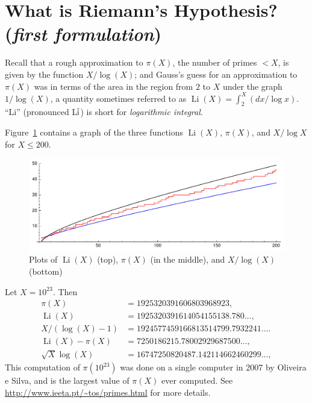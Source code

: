 \documentclass[11pt]{article}
\DeclareMathOperator{\Li}{Li}
\theoremstyle{plain}
\theoremstyle{definition}
\numberwithin{equation}{section}
\numberwithin{figure}{section}
\numberwithin{table}{section}
\begin{document}
\section { What is Riemann's Hypothesis?  ({\em first formulation})\label{sec:rh1}}

\bigskip 

Recall that a rough approximation to $\pi(X)$, the number of primes $<
X$,  is given by the function $X/\log(X)$; and  Gauss's guess for an
approximation to $\pi(X)$  was in terms of the area in the region
from $2$ to $X$ under the graph $1/\log(X)$, a quantity sometimes referred to
as $\Li(X) = \int_2^X (dx/\log x)$.
``Li'' (pronounced L$\overline{\rm i}$) is short for {\em logarithmic integral}.


Figure~\ref{fig:threeplots} contains a graph of the three functions
$\Li(X)$, $\pi(X)$, and $X/\log X$ for $X\leq 200$.
 
\begin{figure}[H]
\begin{center}
\includegraphics[width=.9\textwidth]{illustrations/three_plots}
\caption{Plots of $\Li(X)$ (top), $\pi(X)$ (in the middle), and $X/\log(X)$ (bottom)\label{fig:threeplots}}
\end{center}
\end{figure}
 
Let $X=10^{23}$.  Then \label{pili_vals}
\begin{align*}
  \pi(X) &= 1925320391606803968923,\\
  \Li(X) &= 1925320391614054155138.780\ldots, \\
  X/(\log(X)-1)  &=  1924577459166813514799.7932241\ldots.\\
  \Li(X) - \pi(X) &= 7250186215.78002929687500\ldots, \\
  \sqrt{X}\log(X) &= 16747250820487.142114662460299 \ldots,
\end{align*}
This computation of $\pi(10^{23})$ was done on a single
computer in 2007 by Oliveira e Silva,
and is the largest value of $\pi(X)$ ever computed.  See
\url{http://www.ieeta.pt/~tos/primes.html} for more details.
 
\end{document}
